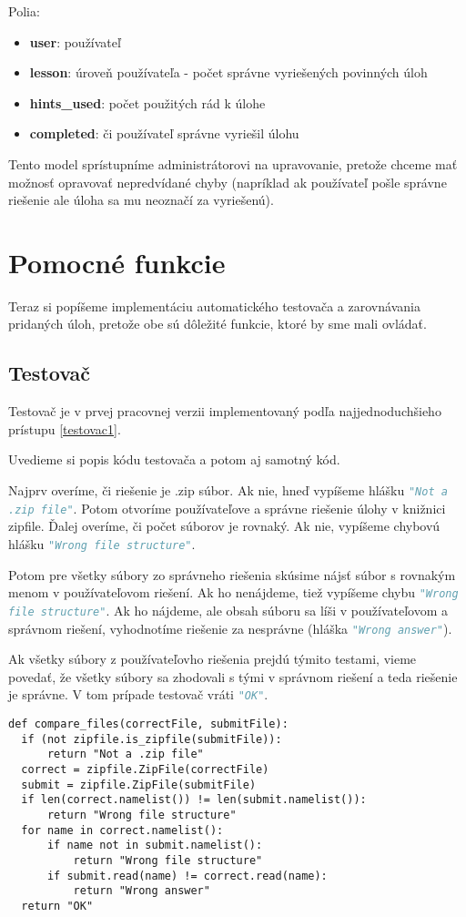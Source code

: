 Polia:
\begin{itemize}
\item \textbf{user}: používateľ
\item \textbf{lesson}: úroveň používateľa - počet správne vyriešených povinných úloh
\item \textbf{hints\_used}: počet použitých rád k úlohe
\item \textbf{completed}: či používateľ správne vyriešil úlohu
\end{itemize}

Tento model sprístupníme administrátorovi na upravovanie, pretože chceme mať možnosť
opravovať nepredvídané chyby (napríklad ak používateľ pošle správne riešenie ale
úloha sa mu neoznačí za vyriešenú).

\protect\section{Pomocné funkcie}
Teraz si popíšeme implementáciu automatického testovača a zarovnávania pridaných úloh, pretože obe sú dôležité
funkcie, ktoré by sme mali ovládať.
\subsection{Testovač}
\label{impl:testovac}
Testovač je v prvej pracovnej verzii implementovaný podľa najjednoduchšieho prístupu \ref{testovac1}.

Uvedieme si popis kódu testovača a potom aj samotný kód.

Najprv overíme, či riešenie je .zip súbor. Ak nie, hneď vypíšeme hlášku \newline\lstinline[language=Python]{"Not a .zip file"}.
Potom otvoríme používateľove a správne riešenie úlohy v knižnici zipfile.
Ďalej overíme, či počet súborov je rovnaký. Ak nie, vypíšeme chybovú hlášku \newline\lstinline[language=Python]{"Wrong file structure"}.

Potom pre všetky súbory zo správneho riešenia skúsime nájsť súbor s rovnakým menom
v používateľovom riešení. Ak ho nenájdeme, tiež vypíšeme chybu \newline\lstinline[language=Python]{"Wrong file structure"}.
Ak ho nájdeme, ale obsah súboru sa líši v
používateľovom a správnom riešení, vyhodnotíme riešenie za nesprávne (hláška \lstinline[language=Python]{"Wrong answer"}).

Ak všetky súbory z používateľovho riešenia prejdú týmito testami, vieme povedať,
že všetky súbory sa zhodovali s tými v správnom riešení a teda riešenie je správne.
V tom prípade testovač vráti \lstinline[language=Python]{"OK"}.
\begin{lstlisting}[title = testovač]
def compare_files(correctFile, submitFile):
  if (not zipfile.is_zipfile(submitFile)):
      return "Not a .zip file"
  correct = zipfile.ZipFile(correctFile)
  submit = zipfile.ZipFile(submitFile)
  if len(correct.namelist()) != len(submit.namelist()):
      return "Wrong file structure"
  for name in correct.namelist():
      if name not in submit.namelist():
          return "Wrong file structure"
      if submit.read(name) != correct.read(name):
          return "Wrong answer"
  return "OK"
\end{lstlisting}

